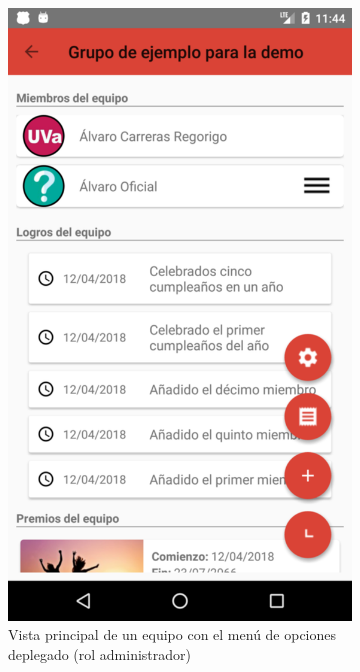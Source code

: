 \documentclass[twoside]{report}
\begin{document}
\begin{figure}[H]
\begin{center}
\begin{subfigure}[t]{.3\linewidth}
		\includegraphics[scale=0.25]{images/userguide/15.png}
		\caption{Vista principal de un equipo con  el menú de opciones deplegado (rol administrador)}
	\end{subfigure}\hspace{2mm}%
	\begin{subfigure}[t]{.3\linewidth}

\end{subfigure}
\end{center}
\end{figure}
\end{document}

